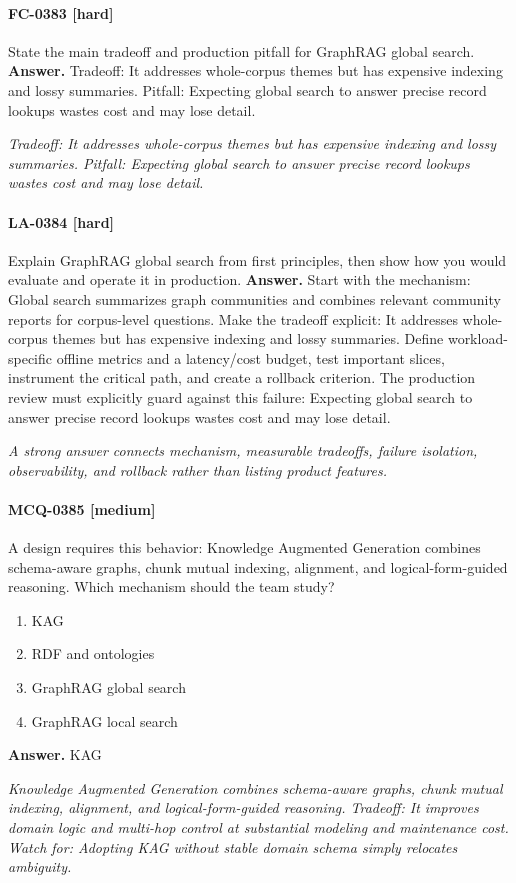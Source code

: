\paragraph{FC-0383 [hard]} State the main tradeoff and production pitfall for GraphRAG global search.
\noindent\textbf{Answer.} Tradeoff: It addresses whole-corpus themes but has expensive indexing and lossy summaries. Pitfall: Expecting global search to answer precise record lookups wastes cost and may lose detail.
\par\textit{Tradeoff: It addresses whole-corpus themes but has expensive indexing and lossy summaries. Pitfall: Expecting global search to answer precise record lookups wastes cost and may lose detail.}
\paragraph{LA-0384 [hard]} Explain GraphRAG global search from first principles, then show how you would evaluate and operate it in production.
\noindent\textbf{Answer.} Start with the mechanism: Global search summarizes graph communities and combines relevant community reports for corpus-level questions. Make the tradeoff explicit: It addresses whole-corpus themes but has expensive indexing and lossy summaries. Define workload-specific offline metrics and a latency/cost budget, test important slices, instrument the critical path, and create a rollback criterion. The production review must explicitly guard against this failure: Expecting global search to answer precise record lookups wastes cost and may lose detail.
\par\textit{A strong answer connects mechanism, measurable tradeoffs, failure isolation, observability, and rollback rather than listing product features.}
\paragraph{MCQ-0385 [medium]} A design requires this behavior: Knowledge Augmented Generation combines schema-aware graphs, chunk mutual indexing, alignment, and logical-form-guided reasoning. Which mechanism should the team study?
\begin{enumerate}[label=\Alph*.]
\item KAG
\item RDF and ontologies
\item GraphRAG global search
\item GraphRAG local search
\end{enumerate}
\noindent\textbf{Answer.} KAG
\par\textit{Knowledge Augmented Generation combines schema-aware graphs, chunk mutual indexing, alignment, and logical-form-guided reasoning. Tradeoff: It improves domain logic and multi-hop control at substantial modeling and maintenance cost. Watch for: Adopting KAG without stable domain schema simply relocates ambiguity.}
